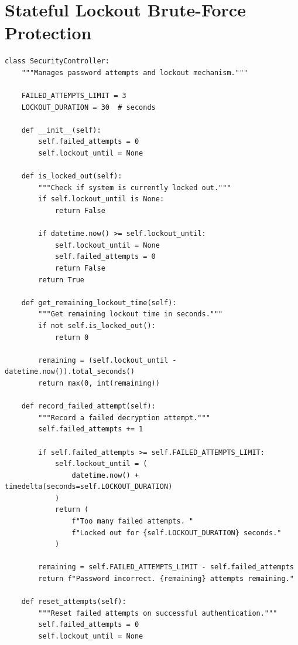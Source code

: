 \documentclass[12pt,a4paper]{report}
\begin{document}
\section{Stateful Lockout Brute-Force Protection}
\begin{lstlisting}
class SecurityController:
    """Manages password attempts and lockout mechanism."""
    
    FAILED_ATTEMPTS_LIMIT = 3
    LOCKOUT_DURATION = 30  # seconds
    
    def __init__(self):
        self.failed_attempts = 0
        self.lockout_until = None
    
    def is_locked_out(self):
        """Check if system is currently locked out."""
        if self.lockout_until is None:
            return False
        
        if datetime.now() >= self.lockout_until:
            self.lockout_until = None
            self.failed_attempts = 0
            return False
        return True
    
    def get_remaining_lockout_time(self):
        """Get remaining lockout time in seconds."""
        if not self.is_locked_out():
            return 0
        
        remaining = (self.lockout_until - datetime.now()).total_seconds()
        return max(0, int(remaining))
    
    def record_failed_attempt(self):
        """Record a failed decryption attempt."""
        self.failed_attempts += 1
        
        if self.failed_attempts >= self.FAILED_ATTEMPTS_LIMIT:
            self.lockout_until = (
                datetime.now() + timedelta(seconds=self.LOCKOUT_DURATION)
            )
            return (
                f"Too many failed attempts. "
                f"Locked out for {self.LOCKOUT_DURATION} seconds."
            )
        
        remaining = self.FAILED_ATTEMPTS_LIMIT - self.failed_attempts
        return f"Password incorrect. {remaining} attempts remaining."
    
    def reset_attempts(self):
        """Reset failed attempts on successful authentication."""
        self.failed_attempts = 0
        self.lockout_until = None
\end{lstlisting}
\end{document}
